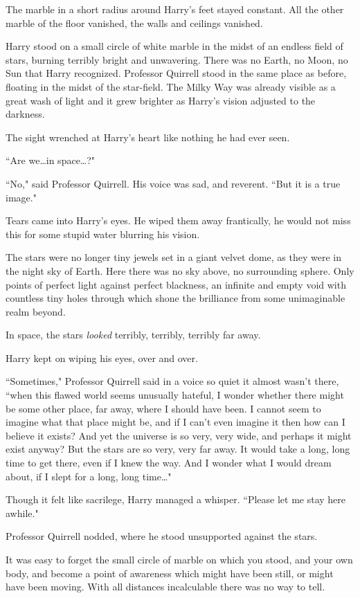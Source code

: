 The marble in a short radius around Harry's feet stayed constant. All the other marble of the floor vanished, the walls and ceilings vanished.

Harry stood on a small circle of white marble in the midst of an endless field of stars, burning terribly bright and unwavering. There was no Earth, no Moon, no Sun that Harry recognized. Professor Quirrell stood in the same place as before, floating in the midst of the star-field. The Milky Way was already visible as a great wash of light and it grew brighter as Harry's vision adjusted to the darkness.

The sight wrenched at Harry's heart like nothing he had ever seen.

``Are we…in space…?"

``No," said Professor Quirrell. His voice was sad, and reverent. ``But it is a true image."

Tears came into Harry's eyes. He wiped them away frantically, he would not miss this for some stupid water blurring his vision.

The stars were no longer tiny jewels set in a giant velvet dome, as they were in the night sky of Earth. Here there was no sky above, no surrounding sphere. Only points of perfect light against perfect blackness, an infinite and empty void with countless tiny holes through which shone the brilliance from some unimaginable realm beyond.

In space, the stars \emph{looked} terribly, terribly, terribly far away.

Harry kept on wiping his eyes, over and over.

``Sometimes," Professor Quirrell said in a voice so quiet it almost wasn't there, ``when this flawed world seems unusually hateful, I wonder whether there might be some other place, far away, where I should have been. I cannot seem to imagine what that place might be, and if I can't even imagine it then how can I believe it exists? And yet the universe is so very, very wide, and perhaps it might exist anyway? But the stars are so very, very far away. It would take a long, long time to get there, even if I knew the way. And I wonder what I would dream about, if I slept for a long, long time…"

Though it felt like sacrilege, Harry managed a whisper. ``Please let me stay here awhile."

Professor Quirrell nodded, where he stood unsupported against the stars.

It was easy to forget the small circle of marble on which you stood, and your own body, and become a point of awareness which might have been still, or might have been moving. With all distances incalculable there was no way to tell.

